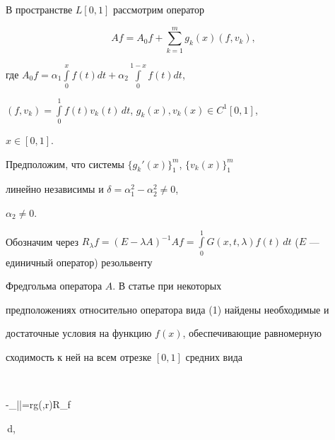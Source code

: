 \date{}




\pagestyle{plain} %







\maketitle


\label{begin}





В пространстве $L[0,1]$ рассмотрим оператор


\begin{equation}


Af=A_0f+\sum\limits_{k=1}^mg_k(x)(f,v_k),


\end{equation}


где $A_0f=\alpha_1\int\limits_0^xf(t)dt+


\alpha_2\int\limits_0^{1-x}f(t)dt$,


$(f,v_k)=\int\limits_0^1f(t)v_k(t)\, dt$, $g_k(x),v_k(x)\in C^1[0,1]$,


$x\in [0,1]$.


Предположим, что системы $\{g_k'(x)\}_1^m$, $\{v_k(x)\}_1^m$


линейно независимы и $\delta=\alpha_1^2-\alpha_2^2\ne0$,


$\alpha_2\ne0$.





Обозначим через $R_\lambda f=(E-\lambda A)^{-1}Af=\int\limits_0^1


G(x,t,\lambda)f(t)\,dt$ ($E$ --- единичный оператор) резольвенту


Фредгольма оператора $A$. В статье при некоторых


предположениях относительно оператора вида (1) найдены необходимые и


достаточные условия на функцию $f(x)$, обеспечивающие равномерную


сходимость к ней на всем отрезке $[0,1]$ средних вида


$$


-\int_{|\lambda|=r}g(\lambda,r)R_\lambda f


\,d\lambda,


